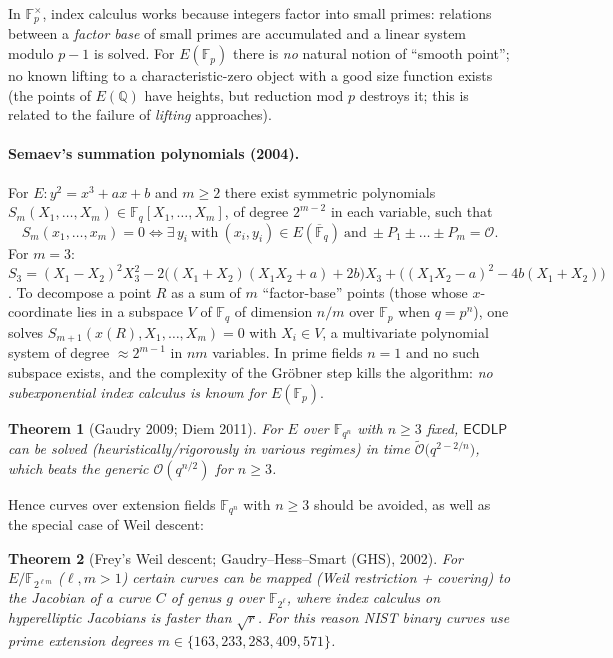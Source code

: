 \documentclass[11pt,a4paper,oneside]{book}
\theoremstyle{plain}
\newtheorem{theorem}{Theorem}[chapter]
\theoremstyle{definition}
\theoremstyle{remark}
\newcommand{\Q}{\mathbb{Q}}
\newcommand{\F}{\mathbb{F}}
\newcommand{\Fp}{\mathbb{F}_p}
\newcommand{\Fq}{\mathbb{F}_q}
\newcommand{\Fqbar}{\overline{\mathbb{F}}_q}
\newcommand{\Oinf}{\mathcal{O}}
\newcommand{\bigO}{\mathcal{O}}
\newcommand{\softO}{\widetilde{\mathcal{O}}}
\newcommand{\ECDLP}{\mathsf{ECDLP}}
\begin{document}
In $\F_p^\times$, index calculus works because integers factor into small primes: relations between a \emph{factor base} of small primes are accumulated and a linear system modulo $p-1$ is solved. For $E(\Fp)$ there is \emph{no} natural notion of ``smooth point''; no known lifting to a characteristic-zero object with a good size function exists (the points of $E(\Q)$ have heights, but reduction mod $p$ destroys it; this is related to the failure of \emph{lifting} approaches).

\paragraph{Semaev's summation polynomials (2004).} For $E:y^2=x^3+ax+b$ and $m\ge2$ there exist symmetric polynomials $S_{m}(X_1,\dots,X_{m})\in\Fq[X_1,\dots,X_{m}]$, of degree $2^{m-2}$ in each variable, such that
\[
S_m(x_1,\dots,x_m)=0\iff\exists\,y_i\ \text{with}\ (x_i,y_i)\in E(\Fqbar)\ \text{and}\ \pm P_1\pm\dots\pm P_m=\Oinf .
\]
For $m=3$: $S_3=(X_1-X_2)^2X_3^2-2\big((X_1+X_2)(X_1X_2+a)+2b\big)X_3+\big((X_1X_2-a)^2-4b(X_1+X_2)\big)$.
To decompose a point $R$ as a sum of $m$ ``factor-base'' points (those whose $x$-coordinate lies in a subspace $V$ of $\Fq$ of dimension $n/m$ over $\F_p$ when $q=p^n$), one solves $S_{m+1}(x(R),X_1,\dots,X_m)=0$ with $X_i\in V$, a multivariate polynomial system of degree $\approx2^{m-1}$ in $nm$ variables. In prime fields $n=1$ and no such subspace exists, and the complexity of the Gröbner step kills the algorithm: \emph{no subexponential index calculus is known for $E(\Fp)$}.

\begin{theorem}[Gaudry 2009; Diem 2011]
For $E$ over $\F_{q^n}$ with $n\ge3$ fixed, $\ECDLP$ can be solved (heuristically/rigorously in various regimes) in time $\softO\big(q^{2-2/n}\big)$, which beats the generic $\bigO(q^{n/2})$ for $n\ge 3$.
\end{theorem}

Hence curves over extension fields $\F_{q^n}$ with $n\ge3$ should be avoided, as well as the special case of Weil descent:

\begin{theorem}[Frey's Weil descent; Gaudry--Hess--Smart (GHS), 2002]
For $E/\F_{2^{\ell m}}$ ($\ell,m>1$) certain curves can be mapped (Weil restriction + covering) to the Jacobian of a curve $C$ of genus $g$ over $\F_{2^\ell}$, where index calculus on hyperelliptic Jacobians is faster than $\sqrt r$. For this reason NIST binary curves use \emph{prime} extension degrees $m\in\{163,233,283,409,571\}$.
\end{theorem}
\end{document}
